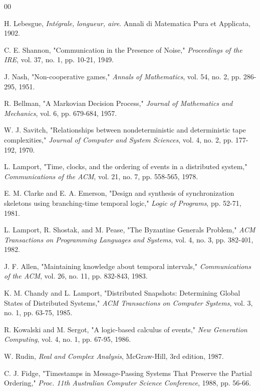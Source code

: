 \documentclass[conference]{IEEEtran}
\begin{document}
\begin{thebibliography}{00}

 H. Lebesgue, \textit{Intégrale, longueur, aire}. Annali di Matematica Pura et Applicata, 1902.

 C. E. Shannon, "Communication in the Presence of Noise," \textit{Proceedings of the IRE}, vol. 37, no. 1, pp. 10-21, 1949.

 J. Nash, "Non-cooperative games," \textit{Annals of Mathematics}, vol. 54, no. 2, pp. 286-295, 1951.

 R. Bellman, "A Markovian Decision Process," \textit{Journal of Mathematics and Mechanics}, vol. 6, pp. 679-684, 1957.

 W. J. Savitch, "Relationships between nondeterministic and deterministic tape complexities," \textit{Journal of Computer and System Sciences}, vol. 4, no. 2, pp. 177-192, 1970.

 L. Lamport, "Time, clocks, and the ordering of events in a distributed system," \textit{Communications of the ACM}, vol. 21, no. 7, pp. 558-565, 1978.

 E. M. Clarke and E. A. Emerson, "Design and synthesis of synchronization skeletons using branching-time temporal logic," \textit{Logic of Programs}, pp. 52-71, 1981.

 L. Lamport, R. Shostak, and M. Pease, "The Byzantine Generals Problem," \textit{ACM Transactions on Programming Languages and Systems}, vol. 4, no. 3, pp. 382-401, 1982.

 J. F. Allen, "Maintaining knowledge about temporal intervals," \textit{Communications of the ACM}, vol. 26, no. 11, pp. 832-843, 1983.

 K. M. Chandy and L. Lamport, "Distributed Snapshots: Determining Global States of Distributed Systems," \textit{ACM Transactions on Computer Systems}, vol. 3, no. 1, pp. 63-75, 1985.

 R. Kowalski and M. Sergot, "A logic-based calculus of events," \textit{New Generation Computing}, vol. 4, no. 1, pp. 67-95, 1986.

 W. Rudin, \textit{Real and Complex Analysis}, McGraw-Hill, 3rd edition, 1987.

 C. J. Fidge, "Timestamps in Message-Passing Systems That Preserve the Partial Ordering," \textit{Proc. 11th Australian Computer Science Conference}, 1988, pp. 56-66.


\end{thebibliography}
\end{document}
